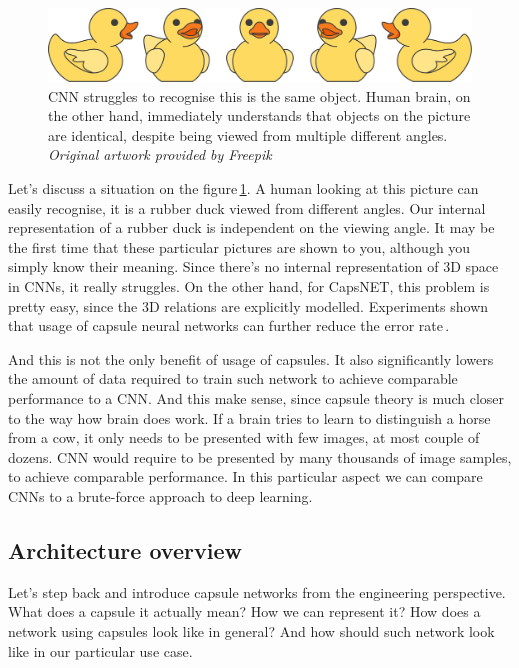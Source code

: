 \begin{figure}[ht]
    \centering
    \includegraphics[width=.8\textwidth]{obrazky-figures/duck.pdf}
    \caption{CNN struggles to recognise this is the same object. Human brain, on the other hand, immediately understands that objects on the picture are identical, despite being viewed from multiple different angles. \textit{Original artwork provided by Freepik\,\cite{freepik}}}
    \label{fig:duck}
\end{figure}

Let's discuss a situation on the figure\,\ref{fig:duck}. A human looking at this picture can easily recognise, it is a rubber duck viewed from different angles. Our internal representation of a rubber duck is independent on the viewing angle. It may be the first time that these particular pictures are shown to you, although you simply know their meaning. Since there's no internal representation of 3D space in CNNs, it really struggles. On the other hand, for CapsNET, this problem is pretty easy, since the 3D relations are explicitly modelled. Experiments shown that usage of capsule neural networks can further reduce the error rate\,\cite{capsule_compare}.

And this is not the only benefit of usage of capsules. It also significantly lowers the amount of data required to train such network to achieve comparable performance to a CNN. And this make sense, since capsule theory is much closer to the way how brain does work. If a brain tries to learn to distinguish a horse from a cow, it only needs to be presented with few images, at most couple of dozens. CNN would require to be presented by many thousands of image samples, to achieve comparable performance. In this particular aspect we can compare CNNs to a brute-force approach to deep learning.

\subsection{Architecture overview}

Let's step back and introduce capsule networks from the engineering perspective. What does a capsule it actually mean? How we can represent it? How does a network using capsules look like in general? And how should such network look like in our particular use case.


